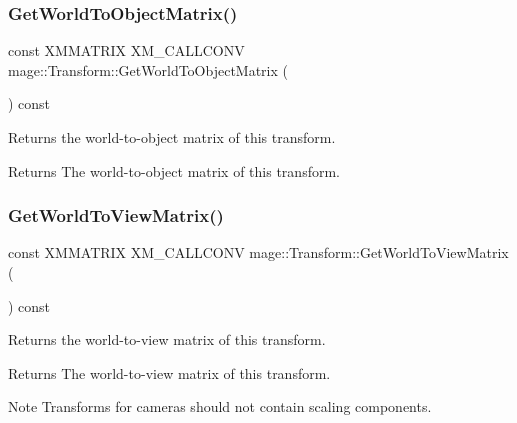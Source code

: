\subsubsection{\texorpdfstring{Get\+World\+To\+Object\+Matrix()}{GetWorldToObjectMatrix()}}
{\footnotesize\ttfamily const X\+M\+M\+A\+T\+R\+IX X\+M\+\_\+\+C\+A\+L\+L\+C\+O\+NV mage\+::\+Transform\+::\+Get\+World\+To\+Object\+Matrix (\begin{DoxyParamCaption}{ }\end{DoxyParamCaption}) const\hspace{0.3cm}{\ttfamily [noexcept]}}

Returns the world-\/to-\/object matrix of this transform.

\begin{DoxyReturn}{Returns}
The world-\/to-\/object matrix of this transform. 
\end{DoxyReturn}
\hypertarget{classmage_1_1_transform_a0ed2ed133c816d8d2066dc83025f9f95}{}\label{classmage_1_1_transform_a0ed2ed133c816d8d2066dc83025f9f95} 
\subsubsection{\texorpdfstring{Get\+World\+To\+View\+Matrix()}{GetWorldToViewMatrix()}}
{\footnotesize\ttfamily const X\+M\+M\+A\+T\+R\+IX X\+M\+\_\+\+C\+A\+L\+L\+C\+O\+NV mage\+::\+Transform\+::\+Get\+World\+To\+View\+Matrix (\begin{DoxyParamCaption}{ }\end{DoxyParamCaption}) const\hspace{0.3cm}{\ttfamily [noexcept]}}

Returns the world-\/to-\/view matrix of this transform.

\begin{DoxyReturn}{Returns}
The world-\/to-\/view matrix of this transform. 
\end{DoxyReturn}
\begin{DoxyNote}{Note}
Transforms for cameras should not contain scaling components. 
\end{DoxyNote}
\hypertarget{classmage_1_1_transform_abf6416b5641ea511c26bdc9a7fac1aad}{}\label{classmage_1_1_transform_abf6416b5641ea511c26bdc9a7fac1aad} 
